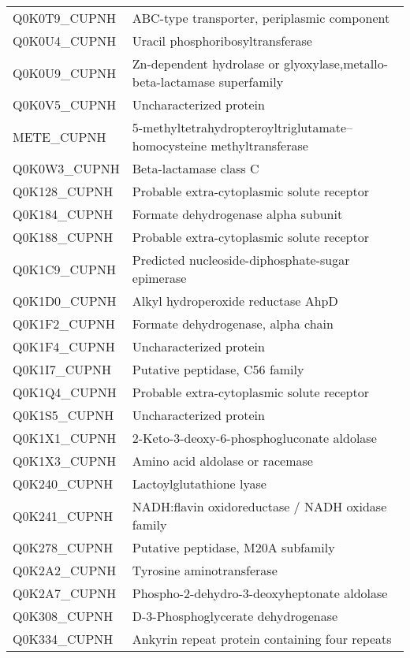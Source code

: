 \begin{center}
\begin{longtable}{ l l }
Q0K0T9\_CUPNH & ABC-type transporter, periplasmic component \\ [0.5ex]
Q0K0U4\_CUPNH & Uracil phosphoribosyltransferase \\ [0.5ex]
Q0K0U9\_CUPNH & Zn-dependent hydrolase or glyoxylase,metallo-beta-lactamase superfamily \\ [0.5ex]
Q0K0V5\_CUPNH & Uncharacterized protein \\ [0.5ex]
METE\_CUPNH & 5-methyltetrahydropteroyltriglutamate--homocysteine methyltransferase \\ [0.5ex]
Q0K0W3\_CUPNH & Beta-lactamase class C \\ [0.5ex]
Q0K128\_CUPNH & Probable extra-cytoplasmic solute receptor \\ [0.5ex]
Q0K184\_CUPNH & Formate dehydrogenase alpha subunit \\ [0.5ex]
Q0K188\_CUPNH & Probable extra-cytoplasmic solute receptor \\ [0.5ex]
Q0K1C9\_CUPNH & Predicted nucleoside-diphosphate-sugar epimerase \\ [0.5ex]
Q0K1D0\_CUPNH & Alkyl hydroperoxide reductase AhpD \\ [0.5ex]
Q0K1F2\_CUPNH & Formate dehydrogenase, alpha chain \\ [0.5ex]
Q0K1F4\_CUPNH & Uncharacterized protein \\ [0.5ex]
Q0K1I7\_CUPNH & Putative peptidase, C56 family \\ [0.5ex]
Q0K1Q4\_CUPNH & Probable extra-cytoplasmic solute receptor \\ [0.5ex]
Q0K1S5\_CUPNH & Uncharacterized protein \\ [0.5ex]
Q0K1X1\_CUPNH & 2-Keto-3-deoxy-6-phosphogluconate aldolase \\ [0.5ex]
Q0K1X3\_CUPNH & Amino acid aldolase or racemase \\ [0.5ex]
Q0K240\_CUPNH & Lactoylglutathione lyase \\ [0.5ex]
Q0K241\_CUPNH & NADH:flavin oxidoreductase / NADH oxidase family \\ [0.5ex]
Q0K278\_CUPNH & Putative peptidase, M20A subfamily \\ [0.5ex]
Q0K2A2\_CUPNH & Tyrosine aminotransferase \\ [0.5ex]
Q0K2A7\_CUPNH & Phospho-2-dehydro-3-deoxyheptonate aldolase \\ [0.5ex]
Q0K308\_CUPNH & D-3-Phosphoglycerate dehydrogenase \\ [0.5ex]
Q0K334\_CUPNH & Ankyrin repeat protein containing four repeats \\ [0.5ex]

\end{longtable}
\end{center}
